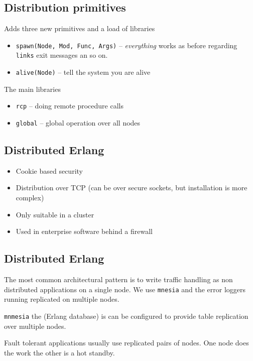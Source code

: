 \documentclass[12pt]{article}
\begin{document}
\subsection{Distribution primitives}

Adds three new primitives and a load of libraries

\begin{itemize}
\item \verb+spawn(Node, Mod, Func, Args)+ -- {\sl everything} works
  as before regarding \verb+links+ exit messages an so on.
\item \verb+alive(Node)+ -- tell the system you are alive
\end{itemize}

The main libraries

\begin{itemize}
\item \verb+rcp+ -- doing remote procedure calls
\item \verb+global+ -- global operation over all nodes
\end{itemize}

\subsection{Distributed Erlang}

\begin{itemize}
\item Cookie based security
\item Distribution over TCP (can be over secure sockets, but
  installation is more complex)
\item Only suitable in a cluster
\item Used in enterprise software behind a firewall
\end{itemize}

\subsection{Distributed Erlang }

The most common architectural pattern is to write traffic handling as
non distributed applications on a single node. We use \verb+mnesia+
and the error loggers running replicated on multiple nodes.

\verb+mnmesia+ the (Erlang database) is can be configured to provide
table replication over multiple nodes.

Fault tolerant applications usually use replicated pairs of nodes. One
node does the work the other is a hot standby.
\end{document}
